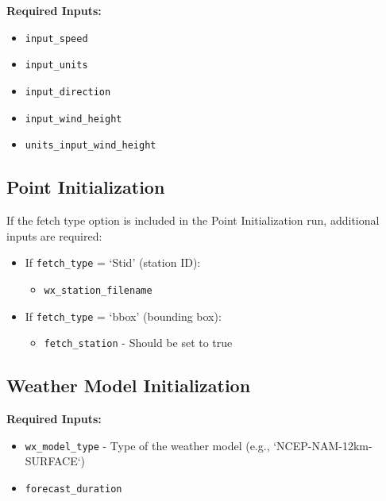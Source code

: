 \documentclass[12pt]{article}
\begin{document}
\textbf{Required Inputs:}
\begin{itemize}
    \item \texttt{input\_speed}
    \item \texttt{input\_units} 
    \item \texttt{input\_direction}
    \item \texttt{input\_wind\_height}
    \item \texttt{units\_input\_wind\_height} 
\end{itemize}

\subsection*{Point Initialization}
If the fetch type option is included in the Point Initialization run, additional inputs are required:

\begin{itemize}
    \item If \texttt{fetch\_type} = `Stid' (station ID):
        \begin{itemize}
            \item \texttt{wx\_station\_filename}
        \end{itemize}
                       
    \item If \texttt{fetch\_type} = `bbox' (bounding box):
        \begin{itemize}
            \item \texttt{fetch\_station} - Should be set to true
        \end{itemize}
\end{itemize}


 


\subsection*{Weather Model Initialization}

\textbf{Required Inputs:}
\begin{itemize}
    \item \texttt{wx\_model\_type} - Type of the weather model (e.g., `NCEP-NAM-12km-SURFACE`)
    \item \texttt{forecast\_duration} 
\end{itemize}
\end{document}
